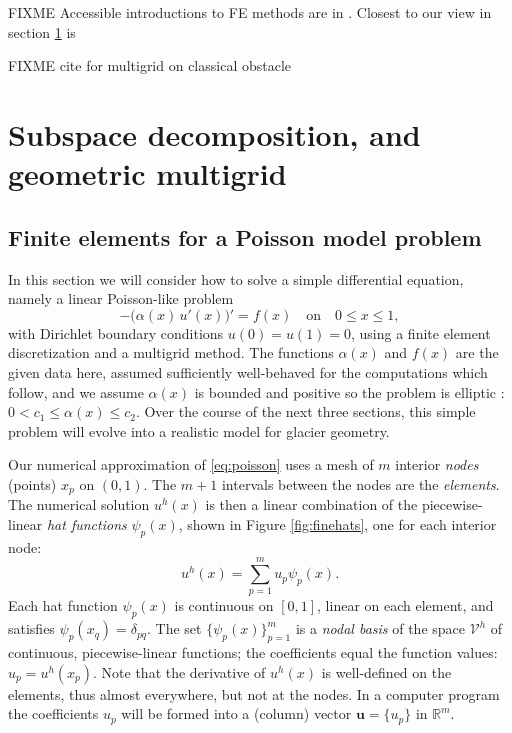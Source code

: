 \documentclass[letterpaper,final,12pt,reqno]{amsart}
\theoremstyle{claim}
\newcommand{\RR}{\mathbb{R}}
\newcommand{\bu}{\mathbf{u}}
\numberwithin{equation}{section}
\numberwithin{figure}{section}
\numberwithin{table}{section}
\numberwithin{theorem}{section}
\begin{document}
FIXME Accessible introductions to FE methods are in \cite{Bueler2021,Elmanetal2014,Johnson2009}.  Closest to our view in section \ref{sec:subspace} is \cite[Chapter V]{Braess2007}

FIXME cite for multigrid on classical obstacle \cite{BrandtCryer1983,Bueler2021,GraeserKornhuber2009}


\section{Subspace decomposition, and geometric multigrid} \label{sec:subspace}

\subsection*{Finite elements for a Poisson model problem}  In this section we will consider how to solve a simple differential equation, namely a linear Poisson-like problem
\begin{equation}
- \big(\alpha(x)\,u'(x)\big)' = f(x) \quad \text{on} \quad 0 \le x \le 1, \label{eq:poisson}
\end{equation}
with Dirichlet boundary conditions $u(0)=u(1)=0$, using a finite element discretization and a multigrid method.  The functions $\alpha(x)$ and $f(x)$ are the given data here, assumed sufficiently well-behaved for the computations which follow, and we assume $\alpha(x)$ is bounded and positive so the problem is elliptic \cite{Evans2010}: $0 < c_1 \le \alpha(x) \le c_2$.  Over the course of the next three sections, this simple problem will evolve into a realistic model for glacier geometry.

Our numerical approximation of \eqref{eq:poisson} uses a mesh of $m$ interior \emph{nodes} (points) $x_p$ on $(0,1)$.  The $m+1$ intervals between the nodes are the \emph{elements}.  The numerical solution $u^h(x)$ is then a linear combination of the piecewise-linear \emph{hat functions} $\psi_p(x)$, shown in Figure \ref{fig:finehats}, one for each interior node:
\begin{equation}
u^h(x) = \sum_{p=1}^m u_p \psi_p(x). \label{eq:trialsolution}
\end{equation}
Each hat function $\psi_p(x)$ is continuous on $[0,1]$, linear on each element, and satisfies $\psi_p(x_q) = \delta_{pq}$.  The set $\{\psi_p(x)\}_{p=1}^m$ is a \emph{nodal basis} of the space $\mathcal{V}^h$ of continuous, piecewise-linear functions; the coefficients equal the function values: $u_p=u^h(x_p)$.  Note that the derivative of $u^h(x)$ is well-defined on the elements, thus almost everywhere, but not at the nodes.  In a computer program the coefficients $u_p$ will be formed into a (column) vector $\bu=\{u_p\}$ in $\RR^m$.
\end{document}
